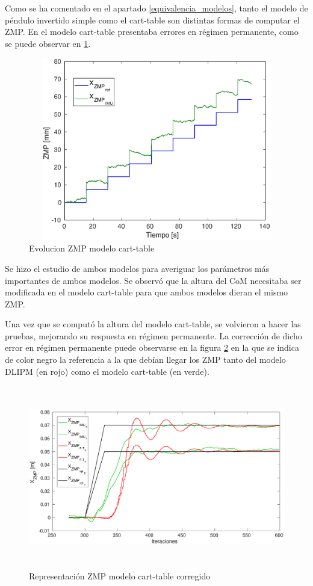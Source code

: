 Como se ha comentado en el apartado \ref{equivalencia_modelos}, tanto el modelo de péndulo invertido simple como el cart-table son distintas formas de computar el ZMP. En \cite{ref22} el modelo cart-table presentaba errores en régimen permanente, como se puede observar en \ref{figura515}.


\begin{figure}[H]
\centering
\includegraphics[width=13cm, height=8cm]{imagenes/apartado_5/test6_imu2}
\caption{Evolucion ZMP modelo cart-table}
\label{figura515}
\end{figure}

Se hizo el estudio de ambos modelos para averiguar los parámetros más importantes de ambos modelos. Se observó que la altura del CoM necesitaba ser modificada en el modelo cart-table para que ambos modelos dieran el mismo ZMP.

Una vez que se computó la altura del modelo cart-table, se volvieron a hacer las pruebas, mejorando su respuesta en régimen permanente. La corrección de dicho error en régimen permanente puede observarse en la figura \ref{figura516} en la que se indica de color negro la referencia a la que debían llegar los ZMP tanto del modelo DLIPM (en rojo) como el modelo cart-table (en verde).

\begin{figure}[H]
\centering
\includegraphics[width=13cm, height=8cm]{imagenes/apartado_5/test2_imu}
\caption{Representación ZMP modelo cart-table corregido}
\label{figura516}
\end{figure}

